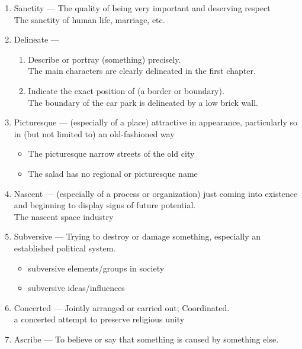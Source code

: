 \documentclass[oneside]{book}
\begin{document}
\begin{enumerate}
    \item Sanctity --- The quality of being very important and deserving respect\\
    \footnotesize  The sanctity of human life, marriage, etc. \normalsize
    \item Delineate ---
    \begin{enumerate}
        \item Describe or portray (something) precisely.\\
        \footnotesize The main characters are clearly delineated in the first chapter. \normalsize 
        \item Indicate the exact position of (a border or boundary).\\ \footnotesize The boundary of the car park is delineated by a low brick wall. \normalsize
    \end{enumerate}
    \item Picturesque --- (especially of a place) attractive in appearance, \small particularly so in (but not limited to) an old-fashioned way
    \footnotesize 
    \begin{itemize}
        \item The picturesque narrow streets of the old city
        \item The salad has no regional or picturesque name
    \end{itemize} \normalsize
    \item Nascent --- (especially of a process or organization) just coming into existence and beginning to display signs of future potential.\\
    \footnotesize The nascent space industry \normalsize
    \item Subversive --- Trying to destroy or damage something, especially an established political system.
    \footnotesize \begin{itemize}
        \item subversive elements/groups in society
        \item subversive ideas/influences
    \end{itemize} \normalsize
    \item Concerted --- Jointly arranged or carried out; Coordinated.\\
    \footnotesize a concerted attempt to preserve religious unity \normalsize
    \item Ascribe --- To believe or say that something is caused by something else.
    \footnotesize \begin{itemize}

\end{itemize}
\end{enumerate}
\end{document}
